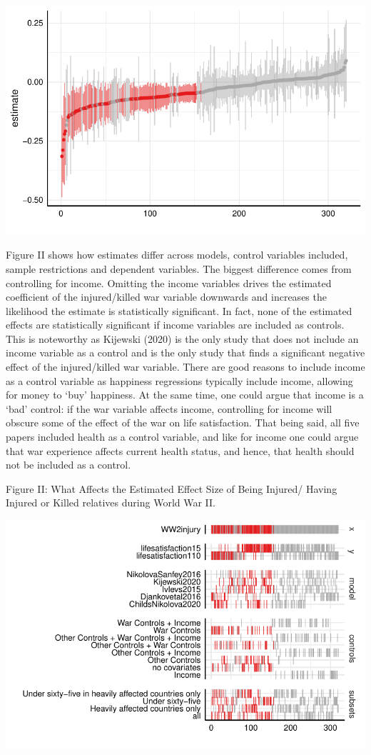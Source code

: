 \documentclass[
  letterpaper,
  DIV=11,
  numbers=noendperiod]{scrartcl}
\begin{document}
\includegraphics{PAPERLongTermImpactofWaronLifeSatisfaction_files/figure-pdf/results to show Ia-1.pdf}

Figure II shows how estimates differ across models, control variables
included, sample restrictions and dependent variables. The biggest
difference comes from controlling for income. Omitting the income
variables drives the estimated coefficient of the injured/killed war
variable downwards and increases the likelihood the estimate is
statistically significant. In fact, none of the estimated effects are
statistically significant if income variables are included as controls.
This is noteworthy as Kijewski (2020) is the only study that does not
include an income variable as a control and is the only study that finds
a significant negative effect of the injured/killed war variable. There
are good reasons to include income as a control variable as happiness
regressions typically include income, allowing for money to `buy'
happiness. At the same time, one could argue that income is a `bad'
control: if the war variable affects income, controlling for income will
obscure some of the effect of the war on life satisfaction. That being
said, all five papers included health as a control variable, and like
for income one could argue that war experience affects current health
status, and hence, that health should not be included as a control.

Figure II: What Affects the Estimated Effect Size of Being Injured/
Having Injured or Killed relatives during World War II.

\includegraphics{PAPERLongTermImpactofWaronLifeSatisfaction_files/figure-pdf/results to show Ib-1.pdf}
\end{document}
